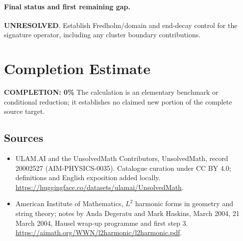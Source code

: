 \documentclass[11pt]{article}
\begin{document}
\paragraph{Final status and first remaining gap.}
\textbf{UNRESOLVED}. Establish Fredholm/domain and end-decay control for the signature operator, including any cluster boundary contributions.

\section{Completion Estimate}
\noindent\textbf{COMPLETION: 0\%}
The calculation is an elementary benchmark or conditional reduction; it establishes no claimed new portion of the complete source target.

\subsection{Sources}
\begin{itemize}
\item[\hypertarget{source:20002527:1}{S1}] ULAM.AI and the UnsolvedMath Contributors, UnsolvedMath, record 20002527 (AIM-PHYSICS-0035). Catalogue curation under CC BY 4.0; definitions and English exposition added locally.
\url{https://huggingface.co/datasets/ulamai/UnsolvedMath}.
\item[\hypertarget{source:20002527:2}{S2}] American Institute of Mathematics, $L^2$ harmonic forms in geometry and string theory; notes by Anda Degeratu and Mark Haskins, March 2004, 21 March 2004, Hausel wrap-up programme and first step 3.
\url{https://aimath.org/WWN/l2harmonic/l2harmonic.pdf}.
\end{itemize}
\label{end:20002527}
\end{document}
